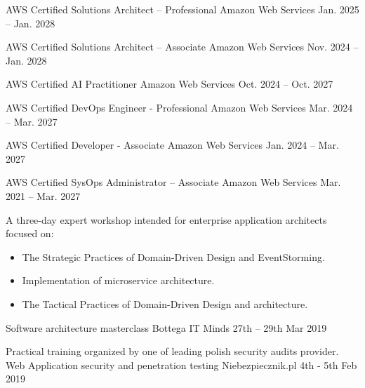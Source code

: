 

\begin{cventries}

	\cventry
    {} %
    {AWS Certified Solutions Architect – Professional} %
    {Amazon Web Services} %
    {Jan. 2025 – Jan. 2028} %
    {}   
    
    \cventry
    {} %
    {AWS Certified Solutions Architect – Associate} %
    {Amazon Web Services} %
    {Nov. 2024 – Jan. 2028} %
    {}   
    
    \cventry
    {} %
    {AWS Certified AI Practitioner} %
    {Amazon Web Services} %
    {Oct. 2024 – Oct. 2027} %
    {}
  
  \cventry
   	{} %
    {AWS Certified DevOps Engineer - Professional} %
    {Amazon Web Services} %
    {Mar. 2024 – Mar. 2027} %
    {} 

  \cventry
    {} %
    {AWS Certified Developer - Associate} %
    {Amazon Web Services} %
    {Jan. 2024 – Mar. 2027} %
    {}
    
  \cventry
    {} %
    {AWS Certified SysOps Administrator – Associate} %
    {Amazon Web Services} %
    {Mar. 2021 – Mar. 2027} %
    {}
   

  \cventry
    {A three-day expert workshop intended for enterprise application architects focused on: 
\begin{itemize}
  \item The Strategic Practices of Domain-Driven Design and EventStorming.
  \item Implementation of microservice architecture.
  \item The Tactical Practices of Domain-Driven Design and architecture. 
\end{itemize}\vspace*{-\baselineskip} } %
    {Software architecture masterclass} %
    {Bottega IT Minds} %
    {27th – 29th Mar 2019} %
    {}

  \cventry
    {Practical training organized by one of leading polish security audits provider. } %
    {Web Application security and penetration testing} %
    {Niebezpiecznik.pl} %
    {4th - 5th Feb 2019} %
    {}



    
\end{cventries}

